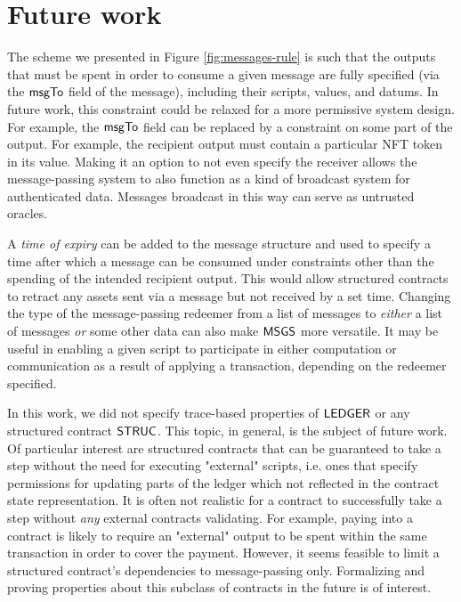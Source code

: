 \section{Future work}
\label{sec:future}

The scheme we presented in Figure \ref{fig:messages-rule} is such that
the outputs that must be spent in order to
consume a given message are fully specified
(via the $\mathsf{msgTo}$ field of the message), including their
scripts, values, and datums. In future work, this constraint
could be relaxed for a more permissive system design. For example, the $\mathsf{msgTo}$
field can be replaced by a constraint on some part of the output. For example,
the recipient output must contain a particular NFT token in its value.
Making it an option to not even specify the receiver allows the message-passing
system to also function as a kind of broadcast system for authenticated data.
Messages broadcast in this way can serve as untrusted oracles.

A \emph{time of expiry} can be added to the message structure and used to specify a time
after which a message can be consumed under constraints other than the
spending of the intended recipient output. This would allow structured contracts
to retract any assets sent via a message but not received by a set time.
Changing the type of the message-passing redeemer from a list of messages
to \emph{either} a list of messages \emph{or} some other data can also
make $\mathsf{MSGS}$ more versatile. It may be useful in
enabling a given script to participate in either computation or communication
as a result of applying a transaction, depending on the redeemer specified.

In this work, we did not specify trace-based properties of $\mathsf{LEDGER}$
or any structured contract $\mathsf{STRUC}$. This topic, in general, is the subject of future
work. Of particular interest are structured contracts that can be guaranteed
to take a step without the need for executing "external" scripts, i.e. ones that
specify permissions for updating parts of the ledger which not reflected in the
contract state representation. It is often not realistic for a contract to
successfully take a step without \emph{any} external contracts validating.
For example, paying into a contract is likely to require an "external" output to be
spent within the same transaction in order to cover the payment. However, it
seems feasible to limit a structured contract's dependencies to message-passing only.
Formalizing and proving properties about this subclass of contracts in the future is
of interest.

